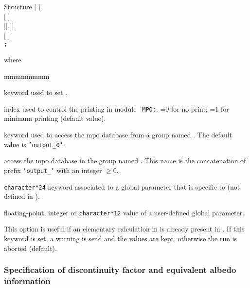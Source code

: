 \vskip -0.5cm

\begin{DataStructure}{Structure }
$[$   $]$ \\
$[$   $]$ \\
$[[$   $]]$ \\
$[$  $]$ \\
{\tt ;}
\end{DataStructure}

\noindent where
\begin{ListeDeDescription}{mmmmmmmm}

\item[\moc{EDIT}] keyword used to set .

\item[\dusa{iprint}] index used to control the printing in module {\tt
MPO:}. =0 for no print; =1 for minimum printing (default value).

\item[\moc{STEP}] keyword used to access the {\sc mpo} database from a group named .
The default value is {\tt 'output\_0'}.

\item[\dusa{NAMDIR}] access the {\sc mpo} database in the group named . This name is
the concatenation of prefix {\tt 'output\_'} with an integer $\ge 0$.

\item[\dusa{parkey}] {\tt character*24} keyword associated to a
global parameter that is specific to  (not defined in ).

\item[\dusa{value}] floating-point, integer or {\tt character*12} value of a user-defined
global parameter.

\item[\moc{WARNING-ONLY}] This option is useful if an elementary calculation in  
is already present in . If this keyword is set, a warning is send and the  values
are kept, otherwise the run is aborted (default).

\end{ListeDeDescription}

\subsubsection{Specification of discontinuity factor and equivalent albedo information}\label{sect:adf}

